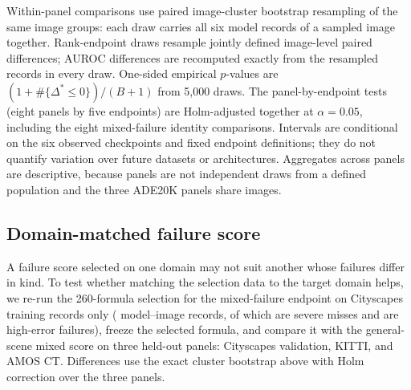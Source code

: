 Within-panel comparisons use paired image-cluster bootstrap resampling of
the same image groups: each draw carries all six model records of a sampled
image together. Rank-endpoint draws resample jointly defined image-level
paired differences; AUROC differences are recomputed exactly from the
resampled records in every draw. One-sided empirical $p$-values are
$(1+\#\{\Delta^*\leq0\})/(B+1)$ from 5,000 draws. The \NFamilyN{}
panel-by-endpoint tests (eight panels by five endpoints) are Holm-adjusted
together at $\alpha=0.05$, including the eight mixed-failure identity
comparisons. Intervals are conditional on the six observed checkpoints and
fixed endpoint definitions; they do not quantify variation over future
datasets or architectures. Aggregates across panels are descriptive, because
panels are not independent draws from a defined population and the three
ADE20K panels share images.

\subsection{Domain-matched failure score}
A failure score selected on one domain may not suit another whose failures
differ in kind. To test whether matching the selection data to the target
domain helps, we re-run the 260-formula selection for the mixed-failure
endpoint on Cityscapes training records only (\NSelDevRecords{} model--image
records, of which \NSelDevSevere{} are severe misses and \NSelDevHigh{} are
high-error failures), freeze the selected formula, and compare it with the
general-scene mixed score on three held-out panels: Cityscapes validation,
KITTI, and AMOS CT. Differences use the exact cluster bootstrap above with Holm
correction over the three panels.
